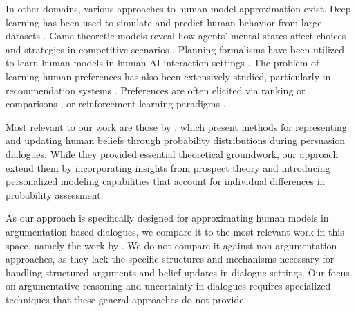 In other domains, various approaches to human model approximation exist. Deep learning has been used to simulate and predict human behavior from large datasets \citep{HAMRICK20198,lake2017building}. Game-theoretic models reveal how agents' mental states affect choices and strategies in competitive scenarios \citep{yoshida2008game,camerer2011behavioral}. Planning formalisms have been utilized to learn human models in human-AI interaction settings \cite{sreedharan2018handling,ijcai2018-671,black2014automated}. The problem of learning human preferences has also been extensively studied, particularly in recommendation systems \cite{furnkranz2010preference}. Preferences are often elicited via ranking or comparisons \cite{ailon2012active,wirth2017survey}, or reinforcement learning paradigms \cite{wilson2012bayesian,biyik2022aprel}.

 

Most relevant to our work are those by \citet{hunter2013probabilistic, hunter2015modelling, hunter2016persuasion}, which present methods for representing and updating human beliefs through probability distributions during persuasion dialogues. While they provided essential theoretical groundwork, our approach extend them by incorporating insights from prospect theory and introducing personalized modeling capabilities that account for individual differences in probability assessment.
 

As our approach is specifically designed for approximating human models in argumentation-based dialogues, we compare it to the most relevant work in this space, namely the work by \citet{hunter2015modelling,hunter2016persuasion}. We do not compare it against non-argumentation approaches, as they lack the specific structures and mechanisms necessary for handling structured arguments and belief updates in dialogue settings. Our focus on argumentative reasoning and uncertainty in dialogues requires specialized techniques that these general approaches do not provide.